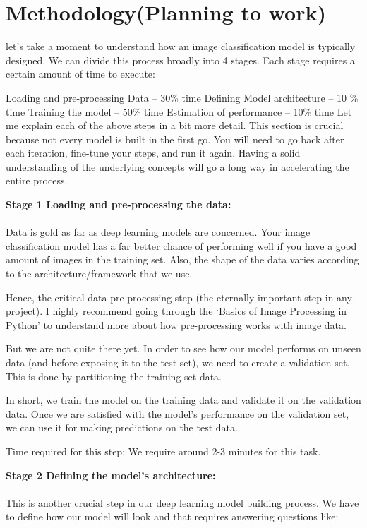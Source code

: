 \documentclass{article}
\begin{document}
\section{Methodology(Planning to work)}
let’s take a moment to understand how an image classification model is typically designed. We can divide this process broadly into 4 stages. Each stage requires a certain amount of time to execute:

Loading and pre-processing Data – 30\% time
Defining Model architecture – 10 \% time
Training the model – 50\% time
Estimation of performance – 10\% time
Let me explain each of the above steps in a bit more detail. This section is crucial because not every model is built in the first go. You will need to go back after each iteration, fine-tune your steps, and run it again. Having a solid understanding of the underlying concepts will go a long way in accelerating the entire process.

\textbf {{\Large Stage 1 Loading and pre-processing the data:}}\\
\\Data is gold as far as deep learning models are concerned. Your image classification model has a far better chance of performing well if you have a good amount of images in the training set. Also, the shape of the data varies according to the architecture/framework that we use.

Hence, the critical data pre-processing step (the eternally important step in any project). I highly recommend going through the ‘Basics of Image Processing in Python’ to understand more about how pre-processing works with image data.

But we are not quite there yet. In order to see how our model performs on unseen data (and before exposing it to the test set), we need to create a validation set. This is done by partitioning the training set data.

In short, we train the model on the training data and validate it on the validation data. Once we are satisfied with the model’s performance on the validation set, we can use it for making predictions on the test data.

Time required for this step: We require around 2-3 minutes for this task.

\textbf {{\Large Stage 2 Defining the model’s architecture:}}\\
\\This is another crucial step in our deep learning model building process. We have to define how our model will look and that requires answering questions like:
\end{document}
